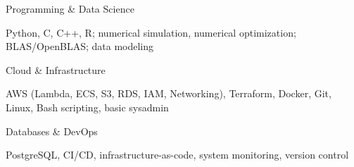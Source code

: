





\begin{cvskills}    
  \cvskill
  {Programming \& Data Science}{\begin{minipage}[t]{0.7\textwidth}
    Python, C, C++, R; numerical simulation, numerical optimization; BLAS/OpenBLAS; data modeling
  \end{minipage}}

  \cvskill
  {Cloud \& Infrastructure}{\begin{minipage}[t]{0.7\textwidth}
    AWS (Lambda, ECS, S3, RDS, IAM, Networking), Terraform, Docker, Git, Linux, Bash scripting, basic sysadmin
  \end{minipage}}

  \cvskill
  {Databases \& DevOps}{\begin{minipage}[t]{0.7\textwidth}
    PostgreSQL, CI/CD, infrastructure-as-code, system monitoring, version control
  \end{minipage}}
\end{cvskills}
